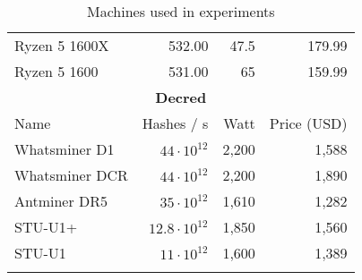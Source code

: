 \begin{longtable}{|p{}|r|r|r|}
  Ryzen 5 1600X & 532.00 & 47.5 & 179.99 \\
  Ryzen 5 1600 & 531.00 & 65 & 159.99 \\
  \hline
  \multicolumn{4}{|c|}{\textbf{Decred}} \\
  \hline
  Name & Hashes / s & Watt & Price (USD) \\
  \hhline{|=|=|=|=|}
  Whatsminer D1 & $44 \cdot 10^{12}$ & 2,200 & 1,588 \\
  Whatsminer DCR & $44 \cdot 10^{12}$ & 2,200 & 1,890 \\
  Antminer DR5 & $35 \cdot 10^{12}$ & 1,610 & 1,282 \\
  STU-U1+ & $12.8 \cdot 10^{12}$ & 1,850 & 1,560 \\
  STU-U1 & $11 \cdot 10^{12}$ & 1,600 & 1,389 \\
  \hline
\caption{Machines used in experiments}
\label{tbl:machines}
\end{longtable}
